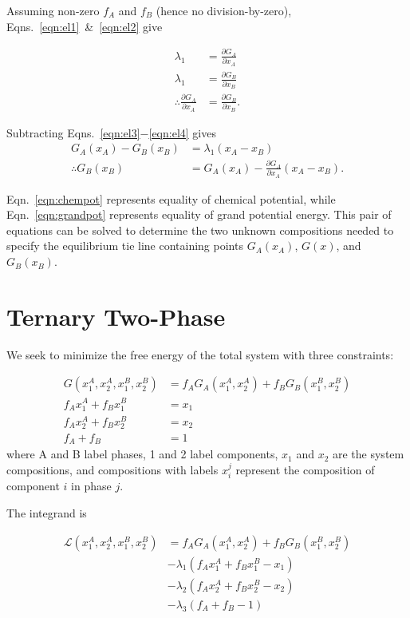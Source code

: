 \documentclass[10pt]{article}
\begin{document}
Assuming non-zero $f_A$ and $f_B$ (hence no division-by-zero), Eqns.~\ref{eqn:el1}~\&~\ref{eqn:el2} give

\begin{align}
  \lambda_1 &= \frac{\partial G_A}{\partial x_A}\\
  \lambda_1 &= \frac{\partial G_B}{\partial x_B}\\
  \label{eqn:chempot}
  \therefore \frac{\partial G_A}{\partial x_A} &= \frac{\partial G_B}{\partial x_B}.
\end{align}

Subtracting Eqns.~\ref{eqn:el3}$-$\ref{eqn:el4} gives
\begin{align}
  G_A(x_A) - G_B(x_B) &= \lambda_1(x_A - x_B)\\
  \label{eqn:grandpot}
  \therefore G_B(x_B) &= G_A(x_A) - \frac{\partial G_A}{\partial x_A}\left(x_A - x_B\right).
\end{align}

Eqn.~\ref{eqn:chempot} represents equality of chemical potential, while
Eqn.~\ref{eqn:grandpot} represents equality of grand potential energy. This pair
of equations can be solved to determine the two unknown compositions needed to
specify the equilibrium tie line containing points $G_A(x_A)$, $G(x)$, and
$G_B(x_B)$.

\section*{Ternary Two-Phase}

We seek to minimize the free energy of the total system with three constraints:

\begin{align}
  G(x_1^A, x_2^A, x_1^B, x_2^B) &= f_A G_A(x_1^A,x_2^A) + f_B G_B(x_1^B, x_2^B)\\
  f_A x_1^A + f_B x_1^B &= x_1\\
  f_A x_2^A + f_B x_2^B &= x_2\\
  f_A + f_B &= 1
\end{align}
where A and B label phases, 1 and 2 label components, $x_1$ and $x_2$ are the system compositions,
and compositions with labels $x_i^j$ represent the composition of component $i$ in phase $j$.

The integrand is

\begin{align}
  \nonumber
  \mathcal{L}(x_1^A, x_2^A, x_1^B, x_2^B) &= f_A G_A(x_1^A, x_2^A) + f_B G_B(x_1^B, x_2^B)\\
  \nonumber
                                          &- \lambda_1(f_A x_1^A + f_B x_1^B - x_1)\\
  \nonumber
                                          &- \lambda_2(f_A x_2^A + f_B x_2^B - x_2)\\
                                          &- \lambda_3(f_A + f_B - 1)
\end{align}
\end{document}

